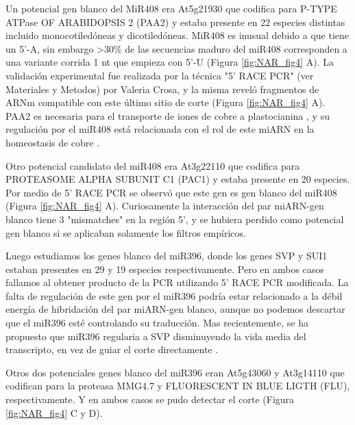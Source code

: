 Un potencial gen blanco del MiR408 era At5g21930 que codifica para P-TYPE ATPase OF ARABIDOPSIS 2 (PAA2) y estaba presente en 22 especies distintas incluido monocotiledóneas y dicotiledóneas.
MiR408 es inusual debido a que tiene un 5'-A, sin embargo >30\% de las secuencias maduro del miR408 corresponden a una variante corrida 1 nt que empieza con 5'-U \citep{Maunoury2011} (Figura \ref{fig:NAR_fig4} A).
La validación experimental fue realizada por la técnica "5' RACE PCR" (ver Materiales y Metodos) por Valeria Crosa, y la misma reveló fragmentos de ARNm compatible con este último sitio de corte (Figura \ref{fig:NAR_fig4} A). 
PAA2 es necesaria para el transporte de iones de cobre a plastocianina \citep{Niyogi2005}, y su regulación por el miR408 está relacionada con el rol de este miARN en la homeostasis de cobre \citep{Yamasaki2007}.

Otro potencial candidato del miR408 era At3g22110 que codifica para PROTEASOME ALPHA SUBUNIT C1 (PAC1) y estaba presente en 20 especies. Por medio de 5' RACE PCR se observó que este gen es gen blanco del miR408 (Figura \ref{fig:NAR_fig4} A). 
Curiosamente la interacción del par miARN-gen blanco tiene 3 "mismatches" en la región 5', y se hubiera perdido como potencial gen blanco si se aplicaban solamente los filtros empíricos.

Luego estudiamos los genes blanco del miR396, donde los genes SVP y SUI1 estaban presentes en 29 y 19 especies respectivamente.
Pero en ambos casos fallamos al obtener producto de la PCR utilizando 5' RACE PCR modificada.
La falta de regulación de este gen por el miR396 podría estar relacionado a la débil energía de hibridación del par miARN-gen blanco, aunque no podemos descartar que el miR396 esté controlando su traducción.
Mas recientemente, se ha propuesto que miR396 regularia a SVP disminuyendo la vida media  del transcripto, en vez de guiar el corte directamente \citep{pmid26103992}.

Otros dos potenciales genes blanco del miR396 eran At5g43060 y At3g14110 que codifican para la proteasa MMG4.7 y FLUORESCENT IN BLUE LIGTH (FLU), respectivamente.
Y en ambos casos se pudo detectar el corte (Figura \ref{fig:NAR_fig4} C y D).


